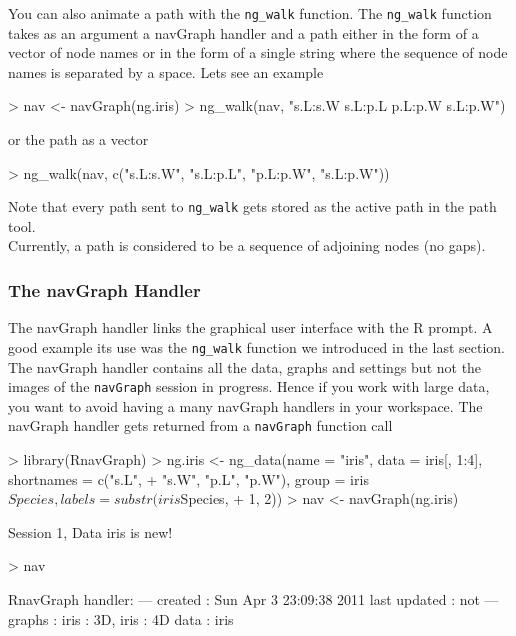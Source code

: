 \documentclass[12pt,oneside,titlepage,letter]{article}
\newcommand{\modify}[1]{{\color{blue}#1}}
\begin{document}
You can also animate a path with the \texttt{ng\_walk} function. The \texttt{ng\_walk} function takes as an argument a navGraph handler and a path either in the form of a vector of node names or in the form of a single string where the sequence of node names is separated by a space. Lets see an example

\begin{Schunk}
\begin{Sinput}
> nav <- navGraph(ng.iris)
> ng_walk(nav, "s.L:s.W s.L:p.L p.L:p.W s.L:p.W")
\end{Sinput}
\end{Schunk}
or the path as a vector
\begin{Schunk}
\begin{Sinput}
> ng_walk(nav, c("s.L:s.W", "s.L:p.L", "p.L:p.W", "s.L:p.W"))
\end{Sinput}
\end{Schunk}
Note that every path sent to \texttt{ng\_walk} gets stored as the active path in the path tool.\\

\modify{Currently, a path is considered to be a sequence of adjoining nodes (no gaps).}

\subsubsection{The navGraph Handler}
The navGraph handler links the graphical user interface with the R prompt. A good example its use was the \texttt{ng\_walk} function we introduced in the last section. The navGraph handler contains all the data, graphs and settings \modify{but not the images} of the \texttt{navGraph} session in progress. Hence if you work with large data, you want to avoid having a many navGraph handlers in your workspace. The navGraph handler gets returned from a \texttt{navGraph} function call
\begin{Schunk}
\begin{Sinput}
> library(RnavGraph)
> ng.iris <- ng_data(name = "iris", data = iris[, 1:4], shortnames = c("s.L", 
+     "s.W", "p.L", "p.W"), group = iris$Species, labels = substr(iris$Species, 
+     1, 2))
> nav <- navGraph(ng.iris)
\end{Sinput}
\begin{Soutput}
Session 1, Data iris is new!
\end{Soutput}
\begin{Sinput}
> nav
\end{Sinput}
\begin{Soutput}
RnavGraph handler:
---
created       : Sun Apr  3 23:09:38 2011 
last updated  : not 
---
graphs        : iris : 3D, iris : 4D 
data          : iris 
\end{Soutput}
\end{Schunk}
\end{document}
